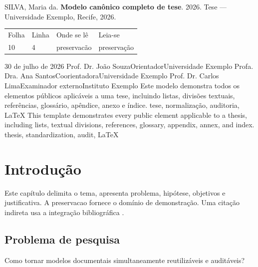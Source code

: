 \documentclass[12pt]{report}
\begin{document}
\ABNTEXacademicoexterna
{}

\ABNTEXacademicopretextual
\ABNTEXfolhaderosto
{}
\ABNTEXerrata
  {SILVA, Maria da. \textbf{Modelo canônico completo de tese}. 2026.
   Tese — Universidade Exemplo, Recife, 2026.}
  {\begin{center}
     \begin{tabular}{llll}
       Folha & Linha & Onde se lê & Leia-se\\
       10 & 4 & preservacão & preservação
     \end{tabular}
   \end{center}}
\ABNTEXfolhadeaprovacao
  {30 de julho de 2026}
  {%
    \ABNTEXmembrobanca
      {Prof. Dr. João Souza}{Orientador}{Universidade Exemplo}
    \ABNTEXmembrobanca
      {Profa. Dra. Ana Santos}{Coorientadora}{Universidade Exemplo}
    \ABNTEXmembrobanca
      {Prof. Dr. Carlos Lima}{Examinador externo}{Instituto Exemplo}
  }
\ABNTEXresumo
  {Este modelo demonstra todos os elementos públicos aplicáveis a uma tese,
   incluindo listas, divisões textuais, referências, glossário, apêndice,
   anexo e índice.}
  {tese, normalização, auditoria, LaTeX}
\ABNTEXresumoemlinguaestrangeira
  {This template demonstrates every public element applicable to a thesis,
   including lists, textual divisions, references, glossary, appendix,
   annex, and index.}
  {thesis, standardization, audit, LaTeX}
\ABNTEXlistadeilustracoes
\ABNTEXlistadetabelas
\ABNTEXlistadeabreviaturasesiglas
\ABNTEXlistadesimbolos
\ABNTEXsumario

\ABNTEXacademicotextual
\chapter{Introdução}
Este capítulo delimita o tema, apresenta problema, hipótese, objetivos e
justificativa. A \gls{preservacao} fornece o domínio de demonstração.
Uma citação indireta usa a integração bibliográfica
\parencite{associacao2025}.

\section{Problema de pesquisa}
Como tornar modelos documentais simultaneamente reutilizáveis e auditáveis?
\end{document}
